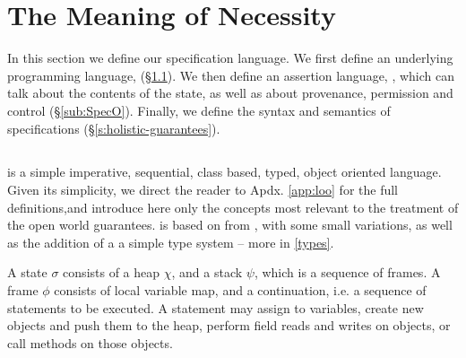 
\section{The Meaning of Necessity}
\label{s:semantics}

 
In this section we define our \Nec specification language.
We first define 
an underlying programming language, \Loo  (\S \ref{sub:Loo}).
We then  define an assertion language, \SpecO,  which can talk about
 the contents of the state, as well as about
provenance, permission and control (\S \ref{sub:SpecO}).
Finally, we define the syntax and semantics of 
\Nec specifications  (\S \ref{s:holistic-guarantees}).


\subsection{\Loo}
\label{sub:Loo} 
 \Loo is a  simple  imperative, sequential, 
class based, typed, object oriented language.
 Given its simplicity, %
 we direct the reader to Apdx. \ref{app:loo} for 
the full definitions,and introduce here only %
 the concepts most relevant to the
treatment of the open world guarantees.
\Loo is based on \LangOO from
\cite{FASE}, with some small variations, as well as 
the addition of a %
 a simple type system -- more in \ref{types}.


A \Loo state $\sigma$ consists of a 
heap $\chi$, and a  {stack $\psi$, which is a sequence of frames}.
A frame $\phi$ consists of
local variable map, and a continuation, i.e. a sequence of statements to be executed.
 A statement may assign to variables, create new objects and push them to the heap, 
perform field reads and writes on objects,  or
 call methods on those objects. 

